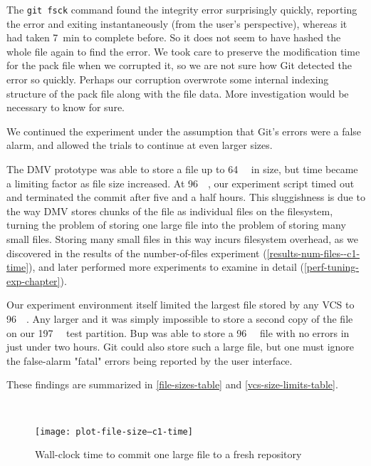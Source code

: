 The \lstinline{git fsck} command found the integrity error surprisingly quickly,
reporting the error and exiting instantaneously (from the user's perspective),
whereas it had taken \SI{7}{\minute} to complete before. So it does not seem to
have hashed the whole file again to find the error. We took care to preserve the
modification time for the pack file when we corrupted it, so we are not sure how
Git detected the error so quickly. Perhaps our corruption overwrote some
internal indexing structure of the pack file along with the file data. More
investigation would be necessary to know for sure.

We continued the experiment under the assumption that Git's errors were a false
alarm, and allowed the trials to continue at even larger sizes.

The \gls{DMV} prototype was able to store a file up to \SI{64}{\gibi\byte} in
size, but time became a limiting factor as file size increased. At
\SI{96}{\gibi\byte}, our experiment script timed out and terminated the
\gls{commit} after five and a half hours. This sluggishness is due to the way
DMV stores chunks of the file as individual files on the filesystem, turning the
problem of storing one large file into the problem of storing many small files.
Storing many small files in this way incurs filesystem overhead, as we
discovered in the results of the number-of-files experiment
(\autoref{results-num-files--c1-time}), and later performed more experiments to
examine in detail (\autoref{perf-tuning-exp-chapter}).

Our experiment environment itself limited the largest file stored by any
\gls{VCS} to \SI{96}{\gibi\byte}. Any larger and it was simply impossible to
store a second copy of the file on our \SI{197}{\gibi\byte} test partition. Bup
was able to store a \SI{96}{\gibi\byte} file with no errors in just under two
hours. Git could also store such a large file, but one must ignore the
false-alarm "fatal" errors being reported by the user interface.

These findings are summarized in \autoref{file-sizes-table} and
\autoref{vcs-size-limits-table}.

%

\clearpage ~~~

\begin{figure}[p]
    \begin{leftfullpage}
        \caption{Wall-clock time to commit one large file to a fresh repository}
        \label{fig:plot-file-size--c1-time}
        \centering

        \explainlogsubfig

        \texttt{[image: plot-file-size--c1-time]}
    \end{leftfullpage}
\end{figure}

